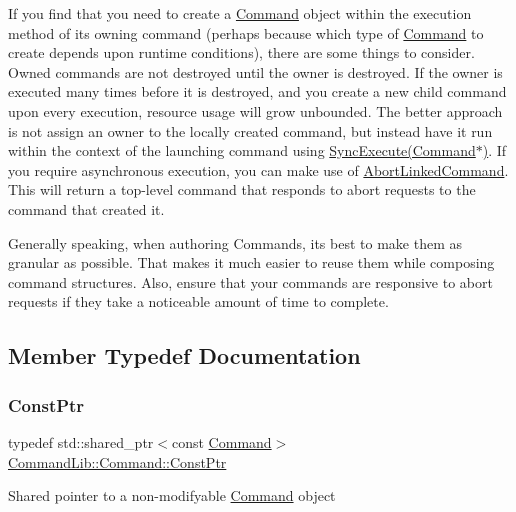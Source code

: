 If you find that you need to create a \mbox{\hyperlink{class_command_lib_1_1_command}{Command}} object within the execution method of its owning command (perhaps because which type of \mbox{\hyperlink{class_command_lib_1_1_command}{Command}} to create depends upon runtime conditions), there are some things to consider. Owned commands are not destroyed until the owner is destroyed. If the owner is executed many times before it is destroyed, and you create a new child command upon every execution, resource usage will grow unbounded. The better approach is not assign an owner to the locally created command, but instead have it run within the context of the launching command using \mbox{\hyperlink{class_command_lib_1_1_command_a663d50889f527a4963eebd88bbcdc522}{Sync\+Execute(\+Command$\ast$)}}. If you require asynchronous execution, you can make use of \mbox{\hyperlink{class_command_lib_1_1_abort_linked_command}{Abort\+Linked\+Command}}. This will return a top-\/level command that responds to abort requests to the command that created it. 

Generally speaking, when authoring Commands, it\textquotesingle{}s best to make them as granular as possible. That makes it much easier to reuse them while composing command structures. Also, ensure that your commands are responsive to abort requests if they take a noticeable amount of time to complete. 

\subsection{Member Typedef Documentation}
\mbox{\label{class_command_lib_1_1_command_aee8fd78ff853a1f9c8e56959c3e81811}} 
\subsubsection{\texorpdfstring{Const\+Ptr}{ConstPtr}}
{\footnotesize\ttfamily typedef std\+::shared\+\_\+ptr$<$const \mbox{\hyperlink{class_command_lib_1_1_command}{Command}}$>$ \mbox{\hyperlink{class_command_lib_1_1_command_aee8fd78ff853a1f9c8e56959c3e81811}{Command\+Lib\+::\+Command\+::\+Const\+Ptr}}}



Shared pointer to a non-\/modifyable \mbox{\hyperlink{class_command_lib_1_1_command}{Command}} object

